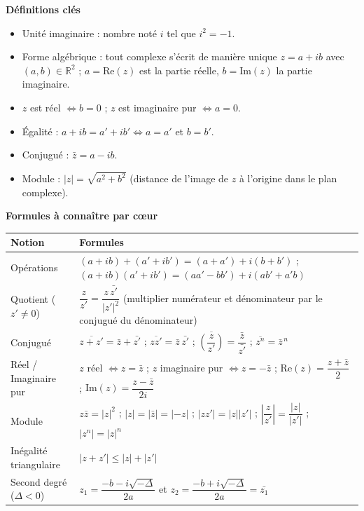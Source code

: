 \documentclass[11pt]{article}
\newcommand{\cle}[1]{{\popxbold\color{popdark}#1}}
\begin{document}
\begin{aretenir}
\textbf{Définitions clés}
\begin{itemize}
  \item \cle{Unité imaginaire} : nombre noté $i$ tel que $i^2=-1$.
  \item \cle{Forme algébrique} : tout complexe s'écrit de manière unique $z=a+ib$ avec $(a,b)\in\mathbb{R}^2$ ; $a=\mathrm{Re}(z)$ est la partie réelle, $b=\mathrm{Im}(z)$ la partie imaginaire.
  \item $z$ est \cle{réel} $\iff b=0$ ; $z$ est \cle{imaginaire pur} $\iff a=0$.
  \item Égalité : $a+ib=a'+ib' \iff a=a'$ et $b=b'$.
  \item \cle{Conjugué} : $\bar{z}=a-ib$.
  \item \cle{Module} : $|z|=\sqrt{a^2+b^2}$ (distance de l'image de $z$ à l'origine dans le plan complexe).
\end{itemize}

\textbf{Formules à connaître par cœur}
\begin{center}
\begin{tabularx}{\linewidth}{|l|X|}
\hline
\rowcolor{popblueL} \textbf{Notion} & \textbf{Formules} \\
\hline
Opérations & $(a+ib)+(a'+ib')=(a+a')+i(b+b')$ ; $(a+ib)(a'+ib')=(aa'-bb')+i(ab'+a'b)$ \\
\hline
Quotient ($z'\neq 0$) & $\dfrac{z}{z'}=\dfrac{z\,\bar{z'}}{|z'|^2}$ \quad (multiplier numérateur et dénominateur par le conjugué du dénominateur) \\
\hline
Conjugué & $\overline{z+z'}=\bar{z}+\bar{z'}$ ; $\overline{zz'}=\bar{z}\,\bar{z'}$ ; $\overline{\left(\dfrac{z}{z'}\right)}=\dfrac{\bar{z}}{\bar{z'}}$ ; $\overline{z^n}=\bar{z}^{\,n}$ \\
\hline
Réel / Imaginaire pur & $z$ réel $\iff z=\bar{z}$ ; $z$ imaginaire pur $\iff z=-\bar{z}$ ; $\mathrm{Re}(z)=\dfrac{z+\bar{z}}{2}$ ; $\mathrm{Im}(z)=\dfrac{z-\bar{z}}{2i}$ \\
\hline
Module & $z\bar{z}=|z|^2$ ; $|z|=|\bar{z}|=|-z|$ ; $|zz'|=|z||z'|$ ; $\left|\dfrac{z}{z'}\right|=\dfrac{|z|}{|z'|}$ ; $|z^n|=|z|^n$ \\
\hline
Inégalité triangulaire & $|z+z'|\le |z|+|z'|$ \\
\hline
Second degré ($\Delta<0$) & $z_1=\dfrac{-b-i\sqrt{-\Delta}}{2a}$ et $z_2=\dfrac{-b+i\sqrt{-\Delta}}{2a}=\bar{z_1}$ \\
\hline
\end{tabularx}
\end{center}
\end{aretenir}
\end{document}
